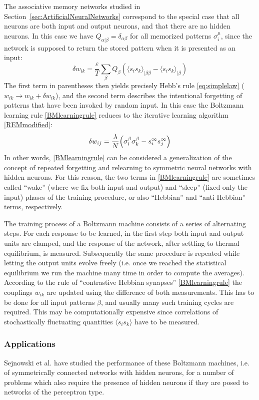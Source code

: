 The associative memory networks studied in Section~\ref{sec:ArtificialNeuralNetworks} correspond to the special case that all neurons are both input and output neurons, and that there are no hidden neurons. In this case we have $Q_{\alpha|\beta}=\delta_{\alpha\beta}$ for all memorized patterns $\sigma_i^\mu$, since the network is supposed to return the stored pattern when it is presented as an input:
\begin{equation}
\delta w_{ik}=\frac{\varepsilon}{T}\sum_\beta Q_\beta\left({\langle s_is_k\rangle}_{|\beta\beta}-{\langle s_is_k\rangle}_{|\beta}\right)
\end{equation}
The first term in parentheses then yields precisely Hebb's rule \eqref{eq:simplelaw} ($w_{ik}\rightarrow w_{ik}+\delta w_{ik}$), and the second term describes the intentional forgetting of patterns that have been invoked by random input. In this case the Boltzmann learning rule \eqref{BMlearningrule} reduces to the iterative learning algorithm \eqref{REMmodified}:
\begin{equation}
\delta w_{ij}=\frac{\lambda}{N}\Bigl(\sigma_i^\beta\sigma_k^\beta-s_i^\infty s_j^\infty\Bigr)
\end{equation}
In other words, \eqref{BMlearningrule} can be considered a generalization of the concept of repeated forgetting and relearning to symmetric neural networks with hidden neurons. For this reason, the two terms in \eqref{BMlearningrule} are sometimes called ``wake'' (where we fix both input and output) and ``sleep'' (fixed only the input) phases of the training procedure, or also ``Hebbian'' and ``anti-Hebbian'' terms, respectively.

The training process of a Boltzmann machine consists of a series of alternating steps. For each response to be learned, in the first step both input and output units are clamped, and the response of the network, after settling to thermal equilibrium, is measured. Subsequently the same procedure is repeated while letting the output units evolve freely (i.e. once we reached the statistical equilibrium we run the machine many time in order to compute the averages). According to the rule of ``contrastive Hebbian synapses'' \eqref{BMlearningrule} the couplings $w_{ik}$ are updated using the difference of both measurements. This has to be done for all input patterns $\beta$, and usually many such training cycles are required. This may be computationally expensive since correlations of stochastically fluctuating quantities $\langle s_is_k\rangle$ have to be measured.
\subsubsection{Applications}
Sejnowski et al. have studied the performance of these Boltzmann machines, i.e. of symmetrically connected networks with hidden neurons, for a number of problems which also require the presence of hidden neurons if they are posed to networks of the perceptron type.

